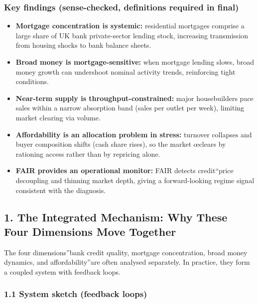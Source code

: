 \documentclass[
]{article}
\providecommand{\tightlist}{%
  \setlength{\itemsep}{0pt}\setlength{\parskip}{0pt}}
\begin{document}
\subsubsection{Key findings (sense-checked, definitions required in
final)}\label{key-findings-sense-checked-definitions-required-in-final}

\begin{itemize}
\tightlist
\item
  \textbf{Mortgage concentration is systemic:} residential mortgages
  comprise a large share of UK bank private-sector lending stock,
  increasing transmission from housing shocks to bank balance sheets.
\item
  \textbf{Broad money is mortgage-sensitive:} when mortgage lending
  slows, broad money growth can undershoot nominal activity trends,
  reinforcing tight conditions.
\item
  \textbf{Near-term supply is throughput-constrained:} major
  housebuilders pace sales within a narrow absorption band (sales per
  outlet per week), limiting market clearing via volume.
\item
  \textbf{Affordability is an allocation problem in stress:} turnover
  collapses and buyer composition shifts (cash share rises), so the
  market œclears by rationing access rather than by repricing alone.
\item
  \textbf{FAIR provides an operational monitor:} FAIR detects
  credit``price decoupling and thinning market depth, giving a
  forward-looking regime signal consistent with the diagnosis.
\end{itemize}

\subsection{1. The Integrated Mechanism: Why These Four Dimensions Move
Together}\label{the-integrated-mechanism-why-these-four-dimensions-move-together}

The four dimensions''bank credit quality, mortgage concentration, broad
money dynamics, and affordability''are often analysed separately. In
practice, they form a coupled system with feedback loops.

\subsubsection{1.1 System sketch (feedback
loops)}\label{system-sketch-feedback-loops}
\end{document}
